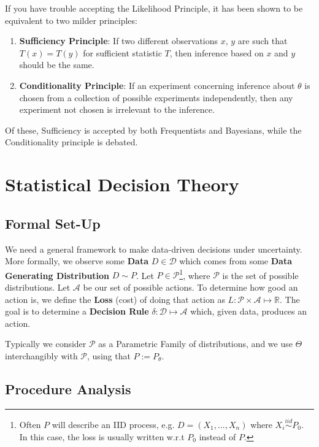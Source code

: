 \documentclass[]{article}
\theoremstyle{mattstyle}
\theoremstyle{definition}
\begin{document}
If you have trouble accepting the Likelihood Principle, it has been shown to be equivalent to two milder principles:
\begin{enumerate}
	\item \textbf{Sufficiency Principle}: If two different observations $x$, $y$ are such that $T(x) = T(y)$ for sufficient statistic $T$, then inference based on $x$ and $y$ should be the same.
	\item \textbf{Conditionality Principle}: If an experiment concerning inference about $\theta$ is chosen from a collection of
	possible experiments independently, then any experiment not chosen is irrelevant to the inference.
\end{enumerate}

Of these, Sufficiency is accepted by both Frequentists and Bayesians, while the Conditionality principle is debated.


\section{Statistical Decision Theory}

\subsection{Formal Set-Up}

We need a general framework to make data-driven decisions under uncertainty. More formally, we observe some \textbf{Data} \(D \in \mathcal{D}\) which comes from some \textbf{Data Generating Distribution} \(D \sim P\). Let \(P\in \mathcal{P}\)\footnote{Often $P$ will describe an IID process, e.g. $D = (X_1,...,X_n)$ where $X_i \overset{iid}\sim P_0$. In this case, the loss is usually written w.r.t $P_0$ instead of $P$.}, where \(\mathcal{P}\) is the set of possible distributions. Let \(\mathcal{A}\) be our set of possible actions. To determine how good an action is, we define the \textbf{Loss} (cost) of doing that action as \(L: \mathcal{P} \times \mathcal{A} \mapsto \mathbb{R}\). The goal is to determine a \textbf{Decision Rule} \(\delta: \mathcal{D} \mapsto \mathcal{A}\) which, given data, produces an action.

Typically we consider \(\mathcal{P}\) as a Parametric Family of distributions, and we use \(\Theta\) interchangibly with \(\mathcal{P}\), using that \(P := P_{\theta}\).

\subsection{Procedure Analysis}
\end{document}
